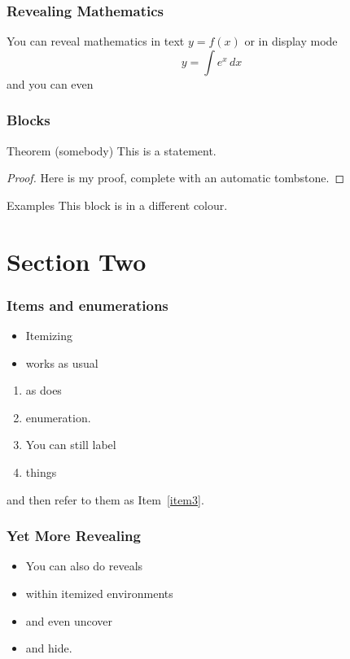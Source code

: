 \documentclass[]%
{beamer}
\begin{document}
\begin{frame}
\frametitle{Revealing Mathematics}

You can reveal mathematics in text
$y=f(x)$
\pause
or in display mode
\[
y=\int e^x\, dx
\]
and you can even
\pause
{}

\end{frame}


\begin{frame}
\frametitle{Blocks}

\begin{block}{Theorem (somebody)}
This is a statement.
\end{block}

\medskip
\begin{proof}
Here is my proof, complete with an automatic tombstone.
\end{proof}

\medskip
\begin{exampleblock}{Examples}
This block is in a different colour.
\end{exampleblock}

\end{frame}


\section{Section Two} %


\begin{frame}
\frametitle{Items and enumerations}

\begin{itemize}
\item Itemizing
\item works as usual
\end{itemize}

\begin{enumerate}
\item as does
\item enumeration.
\item You can still label \label{item3}
\item things
\end{enumerate}

and then refer to them as Item~\ref{item3}.


\end{frame}


\begin{frame}
\frametitle{Yet More Revealing}

\begin{itemize}
\item You can also do reveals
\pause
\item within itemized environments
\pause
\item<3-3> and even uncover
\pause
\item<4-> and hide.
\end{itemize}

\end{frame}
\end{document}
